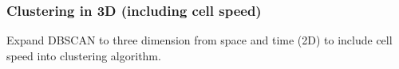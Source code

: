 \documentclass[a4paper,headsepline,footsepline,fontsize=11pt,BCOR=12mm,DIV=12]{report}
\begin{document}
\subsubsection{Clustering in 3D (including cell speed)}
Expand DBSCAN to three dimension from space and time (2D) to include cell speed into clustering algorithm.



{}

\listoffigures

\listoftables

\printglossary[title=List of Acronyms, type=\acronymtype]

\printglossary[title=List of Terms]
\end{document}
